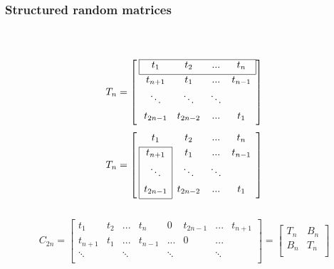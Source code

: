 \begin{frame}[t]
	\frametitle{Structured random matrices}
	\framesubtitle{~~}  %

\left
$$
T_{n} = \left[ \: 
\begin{array}{*{13}{c}}
\cline{1-4}
\multicolumn{1}{|c}{t_{1}} & t_{2} & ...& \multicolumn{1}{c|}{t_{n}}           \\[0.3em]
\cline{1-4}
	t_{n+1} & t_{1} & ... & t_{n-1} \\[0.3em]
	\ddots &\ddots & \ddots &    \\[0.3em]
	t_{2n-1} & t_{2n-2}& ... & t_{1}      \\[0.3em]    
	\end{array}
\right]
$$
$$
T_{n} = \left[ \:
\begin{array}{*{13}{c}}

t_{1} & t_{2} & ...& t_{n}        \\[0.3em]
\cline{1-1}
\multicolumn{1}{|c|}{t_{n+1}} & t_{1} & ... & t_{n-1} \\[0.3em]
\multicolumn{1}{|c|}{\ddots} &\ddots & \ddots &    \\[0.3em]
\multicolumn{1}{|c|}{t_{2n-1}} & t_{2n-2}& ... & t_{1}      \\[0.3em]    
\cline{1-1}
\end{array}
\right]
$$
\\
$$
C_{2n} =\begin{bmatrix}
	t_{1} & t_{2} & ...& t_{n} & 0 & t_{2n-1} & ...&  t_{n+1}           \\[0.3em]
    t_{n+1} & t_{1}  & ... & t_{n-1} & ... & 0 & ...    \\[0.3em]
	\ddots &  & \ddots & & \ddots &  & \ddots \\[0.3em]


	
\end{bmatrix}
 =\begin{bmatrix}
	T_{n} & B_{n}            \\[0.3em]
	B_{n} & T_{n}   \\[0.3em]
\end{bmatrix}
$$
	
\end{frame}

